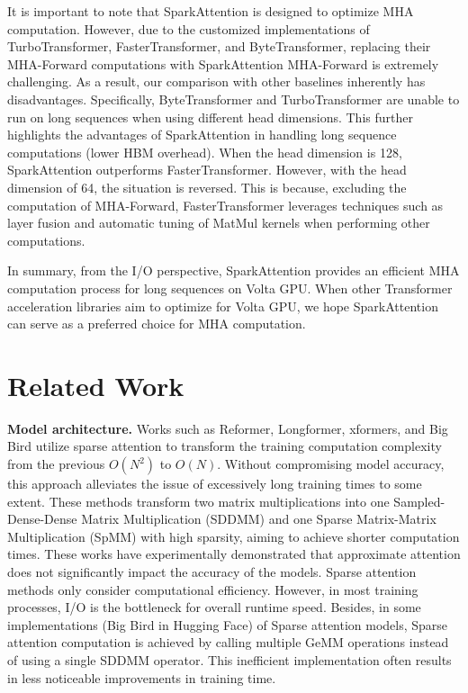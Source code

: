 \documentclass[10pt,twocolumn]{article}
\begin{document}
It is important to note that SparkAttention is designed to optimize MHA computation. 
However, due to the customized implementations of TurboTransformer, FasterTransformer, and ByteTransformer, replacing their MHA-Forward computations with SparkAttention MHA-Forward is extremely challenging. 
As a result, our comparison with other baselines inherently has disadvantages.
Specifically, ByteTransformer and TurboTransformer are unable to run on long sequences when using different head dimensions.
This further highlights the advantages of SparkAttention in handling long sequence computations (lower HBM overhead).
When the head dimension is 128, SparkAttention outperforms FasterTransformer. 
However, with the head dimension of 64, the situation is reversed. 
This is because, excluding the computation of MHA-Forward, FasterTransformer leverages techniques such as layer fusion and automatic tuning of MatMul kernels when performing other computations.

In summary, from the I/O perspective, SparkAttention provides an efficient MHA computation process for long sequences on Volta GPU. 
When other Transformer acceleration libraries aim to optimize for Volta GPU, we hope SparkAttention can serve as a preferred choice for MHA computation.

\section{Related Work} \label{sec6}

\textbf{Model architecture.} Works such as Reformer\cite{kitaev2020reformer}, Longformer\cite{beltagy2020longformer}, xformers\cite{xFormers2022}, and Big Bird\cite{zaheer2020big} utilize sparse attention to transform the training computation complexity from the previous $O(N^2)$ to $O(N)$. 
Without compromising model accuracy, this approach alleviates the issue of excessively long training times to some extent.  
These methods transform two matrix multiplications into one Sampled-Dense-Dense Matrix Multiplication (SDDMM) and one Sparse Matrix-Matrix Multiplication (SpMM) with high sparsity, aiming to achieve shorter computation times. 
These works have experimentally demonstrated that approximate attention does not significantly impact the accuracy of the models.
Sparse attention methods only consider computational efficiency. 
However, in most training processes, I/O is the bottleneck for overall runtime speed. 
Besides, in some implementations (Big Bird in Hugging Face\cite{wolf-etal-2020-transformers}) of Sparse attention models, Sparse attention computation is achieved by calling multiple GeMM operations instead of using a single SDDMM operator. 
This inefficient implementation often results in less noticeable improvements in training time.
\end{document}
